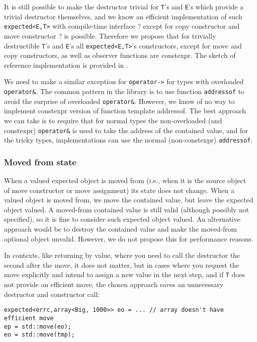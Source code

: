 \documentclass[a4paper,10pt]{article}
\newcommand{\cpp}[1]{\lstinline{#1}}
\begin{document}
It is still possible to make the destructor trivial for \cpp{T}'s and \cpp{E}'s which provide a trivial destructor themselves, and we know an efficient implementation of such  \cpp{expected<E,T>}  with compile-time interface ? except for copy constructor and move constructor ? is possible. Therefore we propose that for trivially destructible \cpp{T}'s and \cpp{E}'s all \cpp{expected<E,T>}'s constructors, except for move and copy constructors, as well as observer functions are constexpr. The sketch of reference implementation is provided in \cite{boost.expected}.

We need to make a similar exception for \cpp{operator->} for types with overloaded \cpp{operator&}. The common pattern in the library is to use function \cpp{addressof} to avoid the surprise of overloaded \cpp{operator&}. However, we know of no way to implement constexpr version of function template addressof. The best approach we can take is to require that for normal types the non-overloaded (and constexpr) \cpp{operator&} is used to take the address of the contained value, and for the tricky types, implementations can use the normal (non-constexpr) \cpp{addressof}. 

\subsubsection{Moved from state}

When a valued expected object is moved from (i.e., when it is the source object of move constructor or move assignment) its state does not change. When a valued object is moved from, we move the contained value, but leave the expected object valued. A moved-from contained value is still valid (although possibly not specified), so it is fine to consider such expected object valued. An alternative approach would be to destroy the contained value and make the moved-from optional object unvalid. However, we do not propose this for performance reasons.

In contexts, like returning by value, where you need to call the destructor the second after the move, it does not matter, but in cases where you request the move explicitly and intend to assign a new value in the next step, and if \cpp{T} does not provide an efficient move, the chosen approach saves an unnecessary destructor and constructor call:

\begin{lstlisting}
expected<errc,array<Big, 1000>> eo = ... // array doesn't have efficient move
ep = std::move(eo);
eo = std::move(tmp);
\end{lstlisting}
\end{document}
